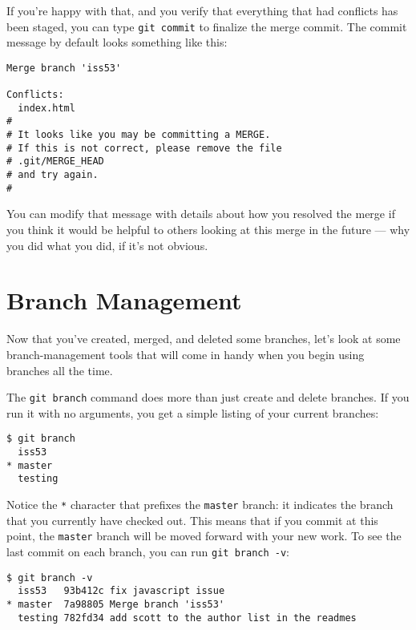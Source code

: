 \documentclass[a4paper]{book}
\begin{document}
If you're happy with that, and you verify that everything that had conflicts has been staged, you can type \texttt{git commit} to finalize the merge commit. The commit message by default looks something like this:

\begin{shaded}\begin{verbatim}
Merge branch 'iss53'

Conflicts:
  index.html
#
# It looks like you may be committing a MERGE.
# If this is not correct, please remove the file
# .git/MERGE_HEAD
# and try again.
#
\end{verbatim}\end{shaded}

You can modify that message with details about how you resolved the merge if you think it would be helpful to others looking at this merge in the future --- why you did what you did, if it's not obvious.

\section{Branch Management}

Now that you've created, merged, and deleted some branches, let's look at some branch-management tools that will come in handy when you begin using branches all the time.

The \texttt{git branch} command does more than just create and delete branches. If you run it with no arguments, you get a simple listing of your current branches:

\begin{shaded}\begin{verbatim}
$ git branch
  iss53
* master
  testing
\end{verbatim}\end{shaded}

Notice the \texttt{*} character that prefixes the \texttt{master} branch: it indicates the branch that you currently have checked out. This means that if you commit at this point, the \texttt{master} branch will be moved forward with your new work. To see the last commit on each branch, you can run \texttt{git branch -v}:

\begin{shaded}\begin{verbatim}
$ git branch -v
  iss53   93b412c fix javascript issue
* master  7a98805 Merge branch 'iss53'
  testing 782fd34 add scott to the author list in the readmes
\end{verbatim}\end{shaded}
\end{document}
